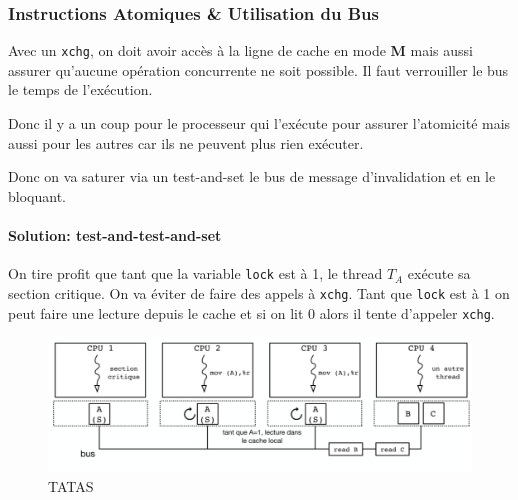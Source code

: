 \subsubsection{Instructions Atomiques \& Utilisation du
Bus}\label{instructions-atomiques-utilisation-du-bus}

Avec un \texttt{xchg}, on doit avoir accès à la ligne de cache en mode
\textbf{M} mais aussi assurer qu'aucune opération concurrente ne soit
possible. Il faut verrouiller le bus le temps de l'exécution.

Donc il y a un coup pour le processeur qui l'exécute pour assurer
l'atomicité mais aussi pour les autres car ils ne peuvent plus rien
exécuter.

Donc on va saturer via un test-and-set le bus de message d'invalidation
et en le bloquant.

\paragraph{Solution:
test-and-test-and-set}\label{solution-test-and-test-and-set}

On tire profit que tant que la variable \texttt{lock} est à 1, le thread
\(T_A\) exécute sa section critique. On va éviter de faire des appels à
\texttt{xchg}. Tant que \texttt{lock} est à 1 on peut faire une lecture
depuis le cache et si on lit 0 alors il tente d'appeler \texttt{xchg}.

\begin{Shaded}
\begin{Highlighting}[]
 \OperatorTok{(}\OperatorTok{(}\OperatorTok{,} \OperatorTok{))} \OperatorTok{\{} 
     \OperatorTok{(}\OperatorTok{)} \OperatorTok{\{}

    \OperatorTok{\}}
\OperatorTok{\}}
\end{Highlighting}
\end{Shaded}

\begin{figure}
\centering
\includegraphics{image-30-1.png}
\caption{TATAS}
\end{figure}

